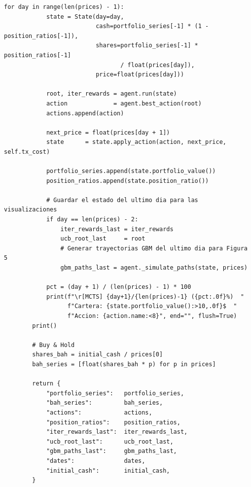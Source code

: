 \documentclass[12pt, a4paper]{article}
\begin{document}
\begin{lstlisting}[caption={Constructor y metodo \texttt{run()} del Backtester}]
        for day in range(len(prices) - 1):
            state = State(day=day,
                          cash=portfolio_series[-1] * (1 - position_ratios[-1]),
                          shares=portfolio_series[-1] * position_ratios[-1]
                                 / float(prices[day]),
                          price=float(prices[day]))

            root, iter_rewards = agent.run(state)
            action             = agent.best_action(root)
            actions.append(action)

            next_price = float(prices[day + 1])
            state      = state.apply_action(action, next_price, self.tx_cost)

            portfolio_series.append(state.portfolio_value())
            position_ratios.append(state.position_ratio())

            # Guardar el estado del ultimo dia para las visualizaciones
            if day == len(prices) - 2:
                iter_rewards_last = iter_rewards
                ucb_root_last     = root
                # Generar trayectorias GBM del ultimo dia para Figura 5
                gbm_paths_last = agent._simulate_paths(state, prices)

            pct = (day + 1) / (len(prices) - 1) * 100
            print(f"\r[MCTS] {day+1}/{len(prices)-1} ({pct:.0f}%)  "
                  f"Cartera: {state.portfolio_value():>10,.0f}$  "
                  f"Accion: {action.name:<8}", end="", flush=True)
        print()

        # Buy & Hold
        shares_bah = initial_cash / prices[0]
        bah_series = [float(shares_bah * p) for p in prices]

        return {
            "portfolio_series":   portfolio_series,
            "bah_series":         bah_series,
            "actions":            actions,
            "position_ratios":    position_ratios,
            "iter_rewards_last":  iter_rewards_last,
            "ucb_root_last":      ucb_root_last,
            "gbm_paths_last":     gbm_paths_last,
            "dates":              dates,
            "initial_cash":       initial_cash,
        }
\end{lstlisting}
\end{document}
